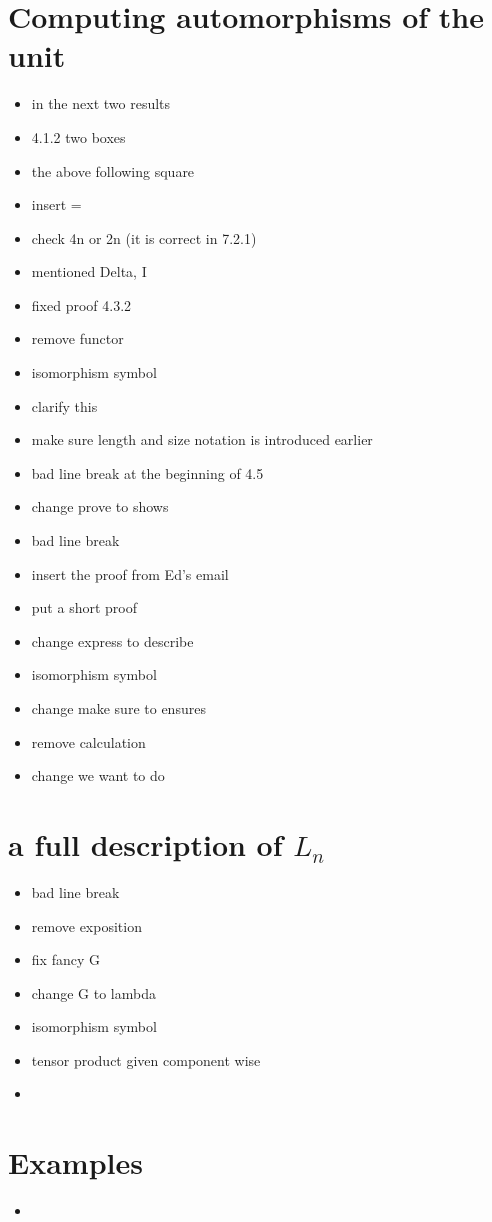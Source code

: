 \documentclass{amsart}
\begin{document}
\section{ Computing automorphisms of the unit}
\begin{itemize}
\item in the next two results
\item 4.1.2 two boxes
\item the above following square
\item insert =
\item check 4n or 2n (it is correct in 7.2.1)
\item mentioned Delta, I
\item fixed proof 4.3.2
\item remove functor


\item isomorphism symbol
\item clarify this
\item make sure length and size notation is introduced earlier
\item bad line break at the beginning of 4.5
\item change prove to shows
\item bad line break
\item insert the proof from Ed's email
\item put a short proof

\item change express to describe

\item isomorphism symbol
\item change make sure to ensures
\item remove calculation
\item change we want to do
\end{itemize}

\section{a full description of $L_n $}
\begin{itemize}
\item bad line break
\item remove exposition
\item fix fancy G
\item change G to lambda
\item isomorphism symbol
\item tensor product given component wise


\item 
\end{itemize}
\section{ Examples}
\begin{itemize}
\item 
\end{itemize}
\end{document}
